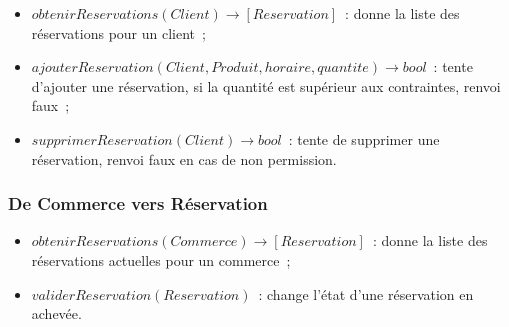 \documentclass[a4paper,12pt]{article}
\begin{document}
\begin{itemize}
	\item $obtenirReservations(Client) \rightarrow [Reservation]$~: donne la liste des réservations pour un client~;
	\item $ajouterReservation(Client, Produit, horaire, quantite) \rightarrow bool$~: tente d'ajouter une réservation, si la quantité est supérieur aux contraintes, renvoi faux~;
	\item $supprimerReservation(Client) \rightarrow bool$~: tente de supprimer une réservation, renvoi faux en cas de non permission.
\end{itemize}

\subsubsection{De Commerce vers Réservation}

\begin{itemize}
	\item $obtenirReservations(Commerce) \rightarrow [Reservation]$~: donne la liste des réservations actuelles pour un commerce~;
	\item $validerReservation(Reservation)$~: change l'état d'une réservation en achevée.
\end{itemize}
\end{document}
